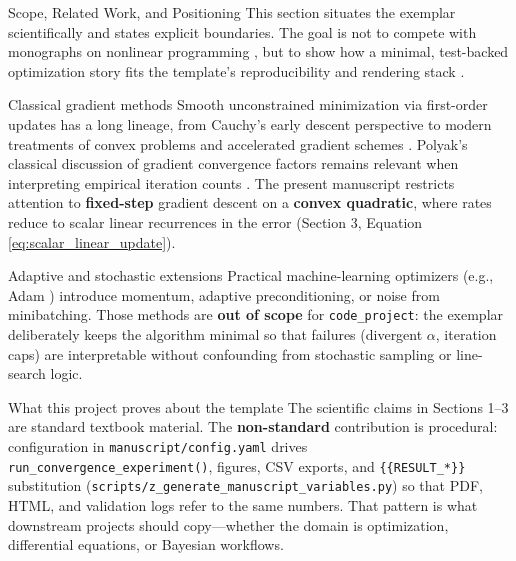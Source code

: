 \documentclass[
  ignorenonframetext,
]{beamer}
\author{\texorpdfstring{}{}}
\date{}
\begin{document}
\begin{frame}[fragile]{Scope, Related Work, and Positioning}
\protect{}\label{scope-related-work-and-positioning}
This section situates the exemplar scientifically and states explicit
boundaries. The goal is not to compete with monographs on nonlinear
programming \cite{nocedal2006numerical,bertsekas1999nonlinear}, but to
show how a minimal, test-backed optimization story fits the template's
reproducibility and rendering stack \cite{peng2011reproducible}.

\begin{block}{Classical gradient methods}
\protect{}\label{classical-gradient-methods}
Smooth unconstrained minimization via first-order updates has a long
lineage, from Cauchy's early descent perspective
\cite{cauchy1847methode} to modern treatments of convex problems
\cite{boyd2004convex} and accelerated gradient schemes
\cite{nesterov2013gradient}. Polyak's classical discussion of gradient
convergence factors remains relevant when interpreting empirical
iteration counts \cite{polyak1964some}. The present manuscript restricts
attention to \textbf{fixed-step} gradient descent on a \textbf{convex
quadratic}, where rates reduce to scalar linear recurrences in the error
(Section 3, Equation \ref{eq:scalar_linear_update}).
\end{block}

\begin{block}{Adaptive and stochastic extensions}
\protect{}\label{adaptive-and-stochastic-extensions}
Practical machine-learning optimizers (e.g., Adam \cite{kingma2014adam})
introduce momentum, adaptive preconditioning, or noise from
minibatching. Those methods are \textbf{out of scope} for
\texttt{code\_project}: the exemplar deliberately keeps the algorithm
minimal so that failures (divergent \(\alpha\), iteration caps) are
interpretable without confounding from stochastic sampling or
line-search logic.
\end{block}

\begin{block}{What this project proves about the template}
\protect{}\label{what-this-project-proves-about-the-template}
The scientific claims in Sections 1--3 are standard textbook material.
The \textbf{non-standard} contribution is procedural: configuration in
\texttt{manuscript/config.yaml} drives
\texttt{run\_convergence\_experiment()}, figures, CSV exports, and
\texttt{\{\{RESULT\_*\}\}} substitution
(\texttt{scripts/z\_generate\_manuscript\_variables.py}) so that PDF,
HTML, and validation logs refer to the same numbers. That pattern is
what downstream projects should copy---whether the domain is
optimization, differential equations, or Bayesian workflows.
\end{block}


\end{frame}
\end{document}
